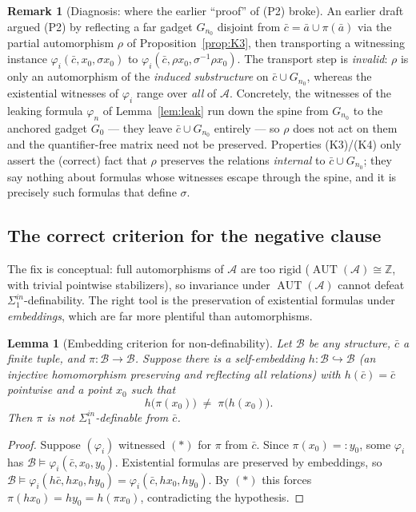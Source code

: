 \documentclass[12pt,fullpage]{article}
\newtheorem{lemma}[theorem]{Lemma}
\theoremstyle{definition}
\newtheorem{remark}[theorem]{Remark}
\newcommand{\A}{\mathcal{A}}
\newcommand{\B}{\mathcal{B}}
\newcommand{\Z}{{\mathbb{Z}}}
\newcommand{\AUT}{\operatorname{AUT}}
\renewcommand{\phi}{\varphi}
\begin{document}
\begin{remark}[Diagnosis: where the earlier ``proof'' of (P2) broke]\label{rem:diagnosis}
An earlier draft argued (P2) by reflecting a far gadget $G_{n_0}$ disjoint
from $\bar c=\bar a\cup\pi(\bar a)$ via the partial automorphism $\rho$ of
Proposition~\ref{prop:K3}, then transporting a witnessing instance
$\phi_i(\bar c,x_0,\sigma x_0)$ to $\phi_i(\bar c,\rho x_0,\sigma^{-1}\rho x_0)$.
The transport step is \emph{invalid}: $\rho$ is only an automorphism of the
\emph{induced substructure} on $\bar c\cup G_{n_0}$, whereas the existential
witnesses of $\phi_i$ range over \emph{all} of $\A$.  Concretely, the
witnesses of the leaking formula $\phi_n$ of Lemma~\ref{lem:leak} run down the
spine from $G_{n_0}$ to the anchored gadget $G_0$ --- they leave
$\bar c\cup G_{n_0}$ entirely --- so $\rho$ does not act on them and the
quantifier-free matrix need not be preserved.  Properties (K3)/(K4) only assert
the (correct) fact that $\rho$ preserves the relations \emph{internal} to
$\bar c\cup G_{n_0}$; they say nothing about formulas whose witnesses escape
through the spine, and it is precisely such formulas that define $\sigma$.
\end{remark}

\subsection*{The correct criterion for the negative clause}

The fix is conceptual: full automorphisms of $\A$ are too rigid
($\AUT(\A)\cong\Z$, with trivial pointwise stabilizers), so invariance under
$\AUT(\A)$ cannot defeat $\Sigma^{in}_1$-definability.  The right tool is the
preservation of existential formulas under \emph{embeddings}, which are far
more plentiful than automorphisms.

\begin{lemma}[Embedding criterion for non-definability]\label{lem:embcrit}
Let $\B$ be any structure, $\bar c$ a finite tuple, and $\pi\colon\B\to\B$.
Suppose there is a self-embedding $h\colon\B\hookrightarrow\B$ (an injective
homomorphism preserving and reflecting all relations) with $h(\bar c)=\bar c$
pointwise and a point $x_0$ such that
\[
h\bigl(\pi(x_0)\bigr)\;\neq\;\pi\bigl(h(x_0)\bigr).
\]
Then $\pi$ is \emph{not} $\Sigma^{in}_1$-definable from $\bar c$.
\end{lemma}

\begin{proof}
Suppose $(\phi_i)$ witnessed $(\ast)$ for $\pi$ from $\bar c$.  Since
$\pi(x_0)=:y_0$, some $\phi_i$ has $\B\models\phi_i(\bar c,x_0,y_0)$.
Existential formulas are preserved by embeddings, so
$\B\models\phi_i(h\bar c,h x_0,h y_0)=\phi_i(\bar c,h x_0,h y_0)$.  By $(\ast)$
this forces $\pi(h x_0)=h y_0=h(\pi x_0)$, contradicting the hypothesis.
\end{proof}
\end{document}

